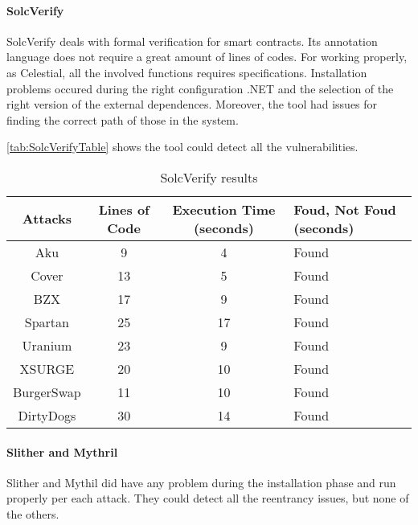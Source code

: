 \paragraph{SolcVerify} SolcVerify deals with formal verification for smart contracts. 
Its annotation language does not require a great amount of lines of codes. 
For working properly, as Celestial, all the involved functions requires specifications. 
Installation problems occured during the right configuration .NET and the selection of the right version of the external dependences.
Moreover, the tool had issues for finding the correct path of those in the system.

\autoref{tab:SolcVerifyTable} shows the tool could detect all the vulnerabilities.

\begin{center}
    \begin{table*}
        \caption{SolcVerify results}
                \label{tab:SolcVerifyTable}
                \begin{tabular}{cccl}
                \toprule
                    Attacks & Lines of Code & Execution Time (seconds) & Foud, Not Foud (seconds)\\
                    \midrule
                    Aku & 9 & 4 & Found \\ 
                    Cover & 13  & 5 & Found \\ 
                    BZX & 17  & 9  & Found \\ 
                    Spartan & 25 &  17 & Found \\ 
                    Uranium  &  23 & 9 & Found \\ 
                    XSURGE & 20 & 10 & Found \\  
                    BurgerSwap & 11 & 10  & Found \\ 
                    DirtyDogs &  30 &  14& Found \\
                \bottomrule
        \end{tabular}
    \end{table*}
    
\end{center}

\paragraph{Slither and Mythril} Slither and Mythil did have any problem during the installation phase and run properly per each attack. 
They could detect all the reentrancy issues, but none of the others.

